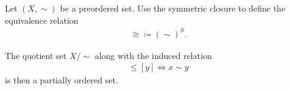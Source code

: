\begin{proposition}\label{thm:preorder_to_partial_order}
  Let $(X, \sim)$ be a preordered set. Use the symmetric closure to define the equivalence relation
  \begin{align*}
    \cong \coloneqq (\sim)^S.
  \end{align*}

  The quotient set $X / \sim$ along with the induced relation
  \begin{align*}
    [x] \leq [y] \iff x \sim y
  \end{align*}
  is then a partially ordered set.
\end{proposition}
